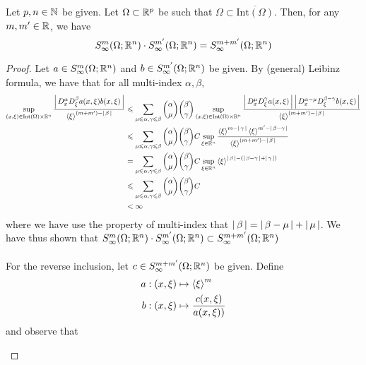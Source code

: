 \documentclass[12pt]{article}
\begin{document}
\begin{fprop}
    Let $p, n \in \N$ be given. Let $\Omega \subset \R^p$ be such that $\Omega \subset \overline{\mathrm{Int}(\Omega)}$. Then, for any $m, m' \in \R$, we have 
    \[
    S^{m}_\infty(\Omega; \R^n) \cdot S^{m'}_\infty(\Omega; \R^n) = S^{m + m'}_\infty(\Omega; \R^n)
    \]
\end{fprop}
\begin{proof}
    Let $a \in S^{m}_\infty(\Omega; \R^n)$ and $b \in S^{m'}_\infty(\Omega; \R^n)$ be given. By (general) Leibinz formula, we have that for all multi-index $\alpha, \beta$, 
    \begin{align*}
        \sup_{(x, \xi) \in \mathrm{Int}(\Omega) \times \R^n} \frac{\abs{D^\alpha_x D^\beta_\xi a(x, \xi)b(x, \xi)}}{\sym[\xi]^{(m + m') - \abs{\beta}}} 
        &\leq  \sum_{\mu \leq \alpha, \gamma \leq \beta} \binom{\alpha}{\mu} \binom{\beta}{\gamma} \sup_{(x, \xi) \in \mathrm{Int}(\Omega) \times \R^n} \frac{\abs{D^\mu_x D^\gamma_\xi a(x, \xi)} \abs{D^{\alpha - \mu}_x D^{\beta - \gamma}_\xi b(x, \xi)}}{\sym[\xi]^{(m + m') - \abs{\beta}}} \\
        &\leq \sum_{\mu \leq \alpha, \gamma \leq \beta} \binom{\alpha}{\mu} \binom{\beta}{\gamma} C \sup_{\xi \in \R^n} \frac{\sym[\xi]^{m - \abs{\gamma}} \sym[\xi]^{m' - \abs{\beta - \gamma}}}{\sym[\xi]^{(m + m') - \abs{\beta}}} \\
        &= \sum_{\mu \leq \alpha, \gamma \leq \beta} \binom{\alpha}{\mu} \binom{\beta}{\gamma} C \sup_{\xi \in \R^n} \sym[\xi]^{\abs{\beta} - (\abs{\beta - \gamma} + \abs{\gamma})} \\
        & \leq \sum_{\mu \leq \alpha, \gamma \leq \beta} \binom{\alpha}{\mu} \binom{\beta}{\gamma} C \\
        &< \infty
    \end{align*}
    where we have use the property of multi-index that $\abs{\beta} = \abs{\beta - \mu} + \abs{\mu}$.  We have thus shown that $S^{m}_\infty(\Omega; \R^n) \cdot S^{m'}_\infty(\Omega; \R^n) \subset S^{m + m'}_\infty(\Omega; \R^n)$\\
    \\
    For the reverse inclusion, let $c \in S^{m + m'}_\infty(\Omega; \R^n)$ be given. Define 
    \begin{align*}
        a : (x, \xi) &\mapsto \sym[\xi]^m\\
        b: (x, \xi) &\mapsto \frac{c(x, \xi)}{a(x, \xi))}
    \end{align*}
    and observe that 
    \begin{itemize}

\end{itemize}
\end{proof}
\end{document}
